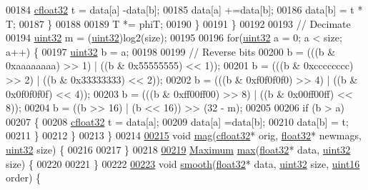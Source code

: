 \begin{DoxyCode}
00184                     \hyperlink{definitions_8hpp_a960be6b6614c08090c16574dba10a421}{cfloat32} t = data[a] -data[b];
00185                     data[a] +=data[b];
00186                     data[b] = t * T;
00187                 \}
00188 
00189                 T *= phiT;
00190             \}
00191         \}
00192 
00193         \textcolor{comment}{// Decimate}
00194         \hyperlink{definitions_8hpp_a1134b580f8da4de94ca6b1de4d37975e}{uint32} m = (\hyperlink{definitions_8hpp_a1134b580f8da4de94ca6b1de4d37975e}{uint32})log2(size);
00195 
00196         \textcolor{keywordflow}{for}(\hyperlink{definitions_8hpp_a1134b580f8da4de94ca6b1de4d37975e}{uint32} a = 0; a < size; a++) \{
00197             \hyperlink{definitions_8hpp_a1134b580f8da4de94ca6b1de4d37975e}{uint32} b = a;
00198 
00199             \textcolor{comment}{// Reverse bits}
00200             b = (((b & 0xaaaaaaaa) >> 1) | ((b & 0x55555555) << 1));
00201             b = (((b & 0xcccccccc) >> 2) | ((b & 0x33333333) << 2));
00202             b = (((b & 0xf0f0f0f0) >> 4) | ((b & 0x0f0f0f0f) << 4));
00203             b = (((b & 0xff00ff00) >> 8) | ((b & 0x00ff00ff) << 8));
00204             b = ((b >> 16) | (b << 16)) >> (32 - m);
00205 
00206             \textcolor{keywordflow}{if} (b > a)
00207             \{
00208                 \hyperlink{definitions_8hpp_a960be6b6614c08090c16574dba10a421}{cfloat32} t = data[a];
00209                 data[a] =data[b];
00210                 data[b] = t;
00211             \}
00212         \}
00213     \}
00214 
\hypertarget{sigmath_8hpp_source_l00215}{}\hyperlink{namespacevaso_a5d355b5c326a852e2ce95c258450898c}{00215}     \textcolor{keywordtype}{void} \hyperlink{namespacevaso_a5d355b5c326a852e2ce95c258450898c}{mag}(\hyperlink{definitions_8hpp_a960be6b6614c08090c16574dba10a421}{cfloat32}* orig, \hyperlink{definitions_8hpp_aacdc525d6f7bddb3ae95d5c311bd06a1}{float32}* newmags, \hyperlink{definitions_8hpp_a1134b580f8da4de94ca6b1de4d37975e}{uint32} size) \{
00216 
00217     \}
00218 
\hypertarget{sigmath_8hpp_source_l00219}{}\hyperlink{namespacevaso_a122846d728be312454a452d379915e10}{00219}     \hyperlink{structMaximum}{Maximum} \hyperlink{namespacevaso_a122846d728be312454a452d379915e10}{max}(\hyperlink{definitions_8hpp_aacdc525d6f7bddb3ae95d5c311bd06a1}{float32}* data, \hyperlink{definitions_8hpp_a1134b580f8da4de94ca6b1de4d37975e}{uint32} size) \{
00220 
00221     \}
00222 
\hypertarget{sigmath_8hpp_source_l00223}{}\hyperlink{namespacevaso_a5b7fc1a58199e2cac989f417a9faa1ce}{00223}     \textcolor{keywordtype}{void} \hyperlink{namespacevaso_a5b7fc1a58199e2cac989f417a9faa1ce}{smooth}(\hyperlink{definitions_8hpp_aacdc525d6f7bddb3ae95d5c311bd06a1}{float32}* data, \hyperlink{definitions_8hpp_a1134b580f8da4de94ca6b1de4d37975e}{uint32} size, \hyperlink{definitions_8hpp_a05f6b0ae8f6a6e135b0e290c25fe0e4e}{uint16} order) \{

\end{DoxyCode}
